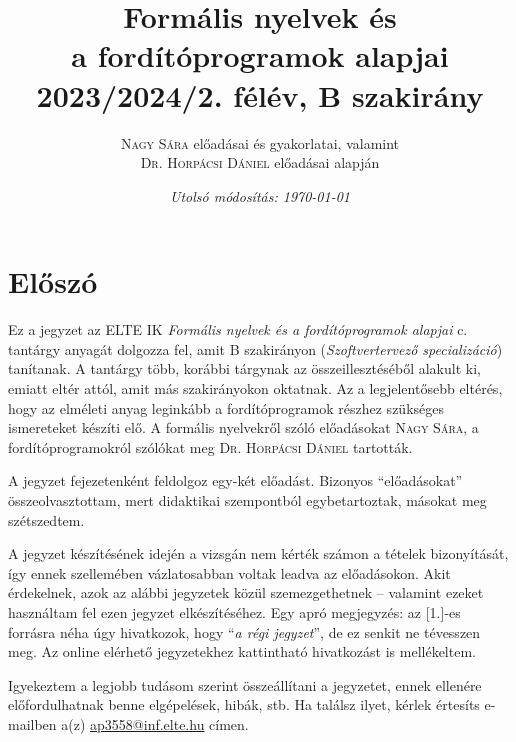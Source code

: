 \documentclass[a4paper,11pt]{book}
\begin{document}
\author{\textsc{Nagy Sára} előadásai és gyakorlatai, valamint \\ \textsc{Dr. Horpácsi Dániel} előadásai alapján}
\title{\textbf{Formális nyelvek és \\ a fordítóprogramok alapjai} \\ {\Large 2023/2024/2. félév, B szakirány} }
\date{\textit{Utolsó módosítás: \today}}

\frontmatter
\maketitle
\tableofcontents

\chapter*{Előszó}

Ez a jegyzet az ELTE IK \textit{Formális nyelvek és a fordítóprogramok alapjai} c. tantárgy anyagát dolgozza fel, amit B szakirányon (\textit{Szoftvertervező specializáció}) tanítanak. A tantárgy több, korábbi tárgynak az összeillesztéséből alakult ki, emiatt eltér attól, amit más szakirányokon oktatnak. Az a legjelentősebb eltérés, hogy az elméleti anyag leginkább a fordítóprogramok részhez szükséges ismereteket készíti elő. A formális nyelvekről szóló előadásokat \textsc{Nagy Sára}, a fordítóprogramokról szólókat meg \textsc{Dr. Horpácsi Dániel} tartották.

A jegyzet fejezetenként feldolgoz egy-két előadást. Bizonyos ``előadásokat'' összeolvasztottam, mert didaktikai szempontból egybetartoztak, másokat meg szétszedtem. %

A jegyzet készítésének idején a vizsgán nem kérték számon a tételek bizonyítását, így ennek szellemében vázlatosabban voltak leadva az előadásokon. Akit érdekelnek, azok az alábbi jegyzetek közül szemezgethetnek -- valamint ezeket használtam fel ezen jegyzet elkészítéséhez. Egy apró megjegyzés: az [1.]-es forrásra néha úgy hivatkozok, hogy ``\textit{a régi jegyzet}'', de ez senkit ne tévesszen meg. Az online elérhető jegyzetekhez kattintható hivatkozást is mellékeltem.

Igyekeztem a legjobb tudásom szerint összeállítani a jegyzetet, ennek ellenére előfordulhatnak benne elgépelések, hibák, stb. Ha találsz ilyet, kérlek értesíts e-mailben a(z) \href{mailto:ap3558@inf.elte.hu}{ap3558@inf.elte.hu} címen.
\end{document}
